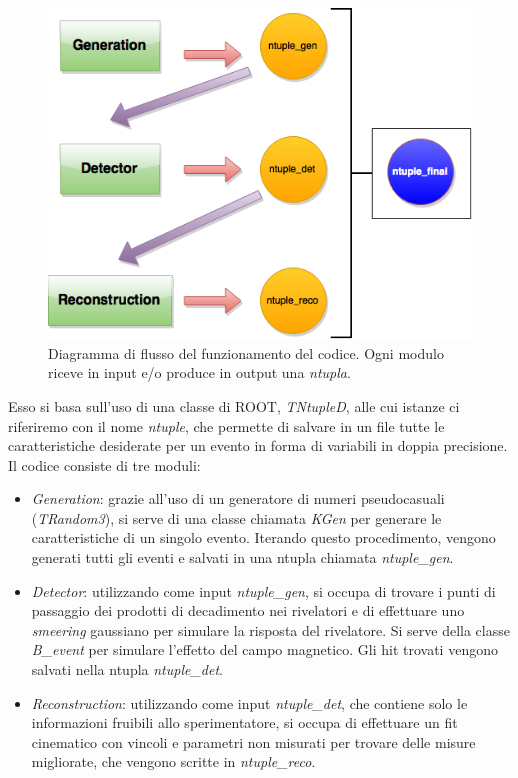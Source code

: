 \documentclass[8pt]{extarticle}
\begin{document}
\begin{figure}
	\begin{center}
		\includegraphics[scale=0.4]{script_structure}
		\caption{Diagramma di flusso del funzionamento del codice. Ogni modulo riceve in input e/o produce in output una \textit{ntupla}.}
		\label{fig:script_structure}
	\end{center}
\end{figure}

Esso si basa sull'uso di una classe di ROOT, \textit{TNtupleD}, alle cui istanze ci riferiremo con il nome \textit{ntuple}, che permette di salvare in un file tutte le caratteristiche desiderate per un evento in forma di variabili in doppia precisione. \\

Il codice consiste di tre moduli: \\
\begin{itemize}
\item \textit{Generation}: grazie all'uso di un generatore di numeri pseudocasuali (\textit{TRandom3}), si serve di una classe chiamata \textit{KGen} per generare le caratteristiche di un singolo evento. Iterando questo procedimento, vengono generati tutti gli eventi e salvati in una ntupla chiamata \textit{ntuple\_gen}.
\item \textit{Detector}: utilizzando come input \textit{ntuple\_gen}, si occupa di trovare i punti di passaggio dei prodotti di decadimento nei rivelatori e di effettuare uno \textit{smeering} gaussiano per simulare la risposta del rivelatore. Si serve della classe \textit{B\_event} per simulare l'effetto del campo magnetico. Gli hit trovati vengono salvati nella ntupla \textit{ntuple\_det}.
\item \textit{Reconstruction}: utilizzando come input \textit{ntuple\_det}, che contiene solo le informazioni fruibili allo sperimentatore, si occupa di effettuare un fit cinematico con vincoli e parametri non misurati per trovare delle misure migliorate, che vengono scritte in \textit{ntuple\_reco}.
\end{itemize}
\end{document}
